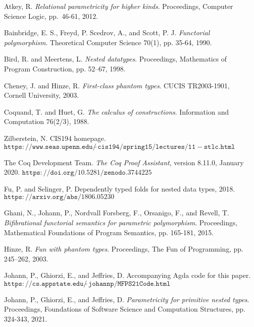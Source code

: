 \documentclass[9pt]{entcs}
\begin{document}
\begin{thebibliography}{10}\label{bibliography}

 Atkey, R.  {\em Relational parametricity for higher
  kinds}.  Proceedings, Computer Science Logic, pp.~46-61, 2012.

 Bainbridge, E. S., Freyd, P. Scedrov, A., and Scott,
  P. J. {\em Functorial polymorphism}. Theoretical Computer Science
  70(1), pp. 35-64, 1990.

 Bird, R. and Meertens, L. {\em Nested
  datatypes}. Proceedings, Mathematics of Program Construction,
  pp. 52–67, 1998.

 Cheney, J. and Hinze, R. {\em First-class phantom
 types}. CUCIS TR2003-1901, Cornell University, 2003.

 Coquand, T. and Huet, G. {\em The calculus of
  constructions}. Information and Computation 76(2/3), 1988.

Zilberstein, N. CIS194 homepage.
$\mathtt{https://www.seas.upenn.edu/\tilde~cis194/spring15/lectures/11\!\!-\!\!stlc.html}$
  

 The Coq Development Team. {\em The Coq Proof
  Assistant}, version 8.11.0, January 2020.
  $\mathtt{https://doi.org/10.5281/zenodo.3744225}$

 Fu, P. and Selinger, P.  Dependently typed folds for
  nested data types, 2018. $\mathtt{https://arxiv.org/abs/1806.05230}$ 
  
 Ghani, N., Johann, P., Nordvall Forsberg, F.,
  Orsanigo, F., and Revell, T. {\em Bifibrational functorial semantics
    for parametric polymorphism}. Proceedings, Mathematical
  Foundations of Program Semantics, pp. 165-181, 2015.

 Hinze, R. {\em Fun with phantom types}. Proceedings,
 The Fun of Programming, pp. 245–262, 2003.

 Johann, P., Ghiorzi, E., and Jeffries,
  D. Accompanying Agda code for this paper.
    $\mathtt{https://cs.appstate.edu/\tilde~johannp/MFPS21Code.html}$
 
 Johann, P., Ghiorzi, E., and Jeffries, D. {\em
  Parametricity for primitive nested types}. Proceedings, Foundations
  of Software Science and Computation Structures, pp. 324-343, 2021.


\end{thebibliography}
\end{document}
